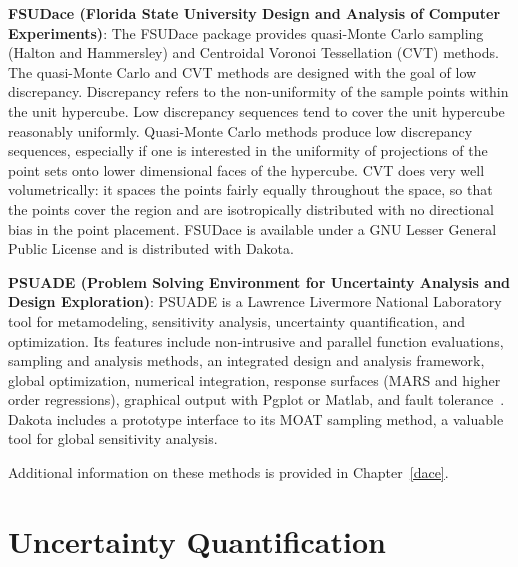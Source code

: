 \textbf{FSUDace (Florida State University Design and Analysis of
Computer Experiments)}: The FSUDace package provides quasi-Monte Carlo
sampling (Halton and Hammersley) and Centroidal Voronoi Tessellation
(CVT) methods.  The quasi-Monte Carlo and CVT methods are
designed with the goal of low discrepancy. Discrepancy refers to the
non-uniformity of the sample points within the unit hypercube. Low
discrepancy sequences tend to cover the unit hypercube reasonably
uniformly. Quasi-Monte Carlo methods produce low discrepancy
sequences, especially if one is interested in the uniformity of
projections of the point sets onto lower dimensional faces of the
hypercube. CVT does very well volumetrically: it spaces
the points fairly equally throughout the space, so that the points
cover the region and are isotropically distributed with no directional
bias in the point placement.
FSUDace is available under a GNU Lesser General Public
License and is distributed with Dakota.

\textbf{PSUADE (Problem Solving Environment for Uncertainty Analysis
and Design Exploration)}: PSUADE is a Lawrence Livermore National
Laboratory tool for metamodeling, sensitivity analysis, uncertainty
quantification, and optimization.  Its features include non-intrusive
and parallel function evaluations, sampling and analysis methods, an
integrated design and analysis framework, global optimization,
numerical integration, response surfaces (MARS and higher order
regressions), graphical output with Pgplot or Matlab, and fault
tolerance~\cite{Ton05}. Dakota includes a prototype interface to its MOAT
sampling method, a valuable tool for global sensitivity analysis.

Additional information on these methods is provided in Chapter~\ref{dace}.

\section{Uncertainty Quantification}\label{capabilities:uncertainty}

